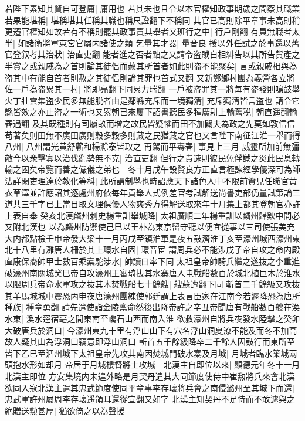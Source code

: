 若陛下素知其賢自可登庸|{
	庸用也}
若其未也且令以本官權知政事期歲之間察其職業若果能堪稱|{
	堪稱堪其任稱其職也稱尺證翻下不稱同}
其官已高則除平章事未高則稍更遷官權知如故若有不稱則罷其政事責其舉者又班行之中|{
	行戶剛翻}
有員無職者太半|{
	如諸衛將軍東宮官屬内諸使之類}
乞量其才器|{
	量音良}
授以外任試之於事還以舊官登叙考其治狀|{
	治直吏翻}
能者進之否者黜之又請令盗賊自相糾告以其所告貲產之半賞之或親戚為之首則論其徒侣而赦其所首者如此則盗不能聚矣|{
	言或親戚相與為盗其中有能自首者則赦之其徒侣則論其罪也首式又翻}
又新鄭鄉村團為義營各立將佐一戶為盗累其一村|{
	將即亮翻下同累力瑞翻}
一戶被盗罪其一將每有盗發則鳴鼓舉火丁壯雲集盗少民多無能脱者由是鄰縣充斥而一境獨清|{
	充斥獨清皆言盗也}
請令它縣皆效之亦止盗之一術也又累朝已來屢下詔書聽民多種廣耕上輸舊税|{
	朝直遥翻輸舂遇翻}
及其既種則有司履畝而增之故民皆疑懼而田不加闢夫為政之先莫如敦信信苟著矣則田無不廣田廣則穀多穀多則藏之民猶藏之官也又言陛下南征江淮一舉而得八州|{
	八州謂光黄舒蘄和楊滁泰皆取之}
再駕而平夀春|{
	事見上三月}
威靈所加前無彊敵今以衆擊寡以治伐亂勢無不克|{
	治直吏翻}
但行之貴速則彼民免俘馘之災此民息轉輸之困矣帝覽而善之儼儀之弟也　冬十月戊午設賢良方正直言極諫經學優深可為師法詳閑吏理達於教化等科|{
	此所謂制舉也時詔應天下諸色人中不限前資見任職官黄衣草澤並許應詔其逐處州府依每年貢舉人式例差官考試解送尚書吏部仍量試策論三道共三千字已上當日取文理俱優人物爽秀方得解送取來年十月集上都其登朝官亦許上表自舉}
癸亥北漢麟州刺史楊重訓舉城降|{
	太祖廣順二年楊重訓以麟州歸欵中間必又附北漢也}
以為麟州防禦使己巳以王朴為東京留守聽以便宜從事以三司使張美充大内都點檢壬申帝發大梁十一月丙戌至鎮淮軍是夜五鼓濟淮丁亥至濠州城西濠州東北十八里有灘唐人柵於其上環水自固|{
	環音宦}
謂周兵必不能涉戊子帝自攻之命内殿直康保裔帥甲士數百乘槖駝涉水|{
	帥讀曰率下同}
太祖皇帝帥騎兵繼之遂抜之李重進破濠州南關城癸巳帝自攻濠州王審琦抜其水寨唐人屯戰船數百於城北植巨木於淮水以限周兵帝命水軍攻之抜其木焚戰船七十餘艘|{
	艘蘇遭翻下同}
斬首二千餘級又攻抜其羊馬城城中震恐丙申夜唐濠州團練使郭廷謂上表言臣家在江南今若遽降恐為唐所種族|{
	種章勇翻}
請先遣使詣金陵禀命然後出降帝許之辛丑帝聞唐有戰船數百艘在渙水東|{
	渙水逕宿亳之間東南至巉石山西而南入淮}
欲救濠州自將兵夜發水陸擊之癸卯大破唐兵於洞口|{
	今濠州東九十里有浮山山下有穴名浮山洞夏潦不能及而冬不加高故人疑其山為浮洞口竊意即浮山洞口}
斬首五千餘級降卒二千餘人因鼓行而東所至皆下乙巳至泗州城下太祖皇帝先攻其南因焚城門破水寨及月城|{
	月城者臨水築城兩頭抱水形如却月}
帝居于月城樓督將士攻城　北漢主自即位以來|{
	顯德元年冬十一月北漢主即位}
方安集境内未遑外略是月契丹遣其大同節度使侍中崔勲將兵來會北漢欲同入寇北漢主遣其忠武節度使同平章事李存瓌將兵會之南侵潞州至其城下而還|{
	忠武軍許州屬周李存瓌遥領耳還從宣翻又如字}
北漢主知契丹不足恃而不敢遽與之絶贈送勲甚厚|{
	猶欲倚之以為聲援}
